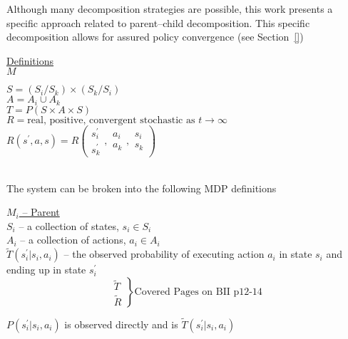 Although many decomposition strategies are possible, this work presents a specific approach related to parent--child decomposition. This specific decomposition allows for assured policy convergence (see Section~\ref{})

\underline{Definitions}\\

\underline{$M$}\quad
\begin{minipage}[t]{5in}
$S=(S_i/S_k)\times(S_k/S_i)$\\
$A=A_i\cup A_k$\\
$T=P(S\times A\times S)$\\
$R= \text{real, positive, convergent stochastic as $t\to\infty$}$\\
$R(s^\prime,a,s) =R\left( 
\begin{array}{c} s^\prime_i \\ s^\prime_k \end{array},
\begin{array}{c} a_i \\ a_k \end{array},
\begin{array}{c} s_i \\ s_k \end{array}
\right)$
\end{minipage}\\

The system can be broken into the following MDP definitions

\underline{$M_i$ -- Parent}\\

$S_i$ -- a collection of states, $s_i\in S_i$\\
$A_i$ -- a collection of actions, $a_i \in A_i$\\
$\tilde{T}( s^\prime_i | s_i, a_i )$ -- the observed probability of executing action $a_i$ in state $s_i$ and ending up in state $s^\prime_i$\\

\begin{equation*}
\left. \begin{array}{l}
\tilde{T}\\
\tilde{R}
\end{array}\right\}
\text{Covered Pages on BII p12-14}
\end{equation*}

$P(s^\prime_i|s_i, a_i)$ is observed directly and is $\tilde{T}( s^\prime_i | s_i, a_i )$\\


